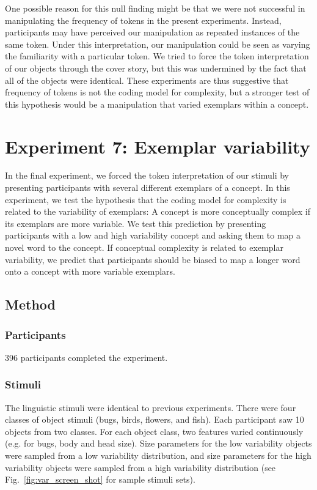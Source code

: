 One possible reason for this null finding might be that we were not successful in manipulating the frequency of tokens in the present experiments. Instead, participants may have perceived our manipulation as repeated instances of the same token. Under this interpretation, our manipulation could be seen as varying the familiarity with a particular token. We tried to force the token interpretation of our objects through the cover story, but this was undermined by the fact that all of the objects were identical. These experiments are thus  suggestive that frequency of tokens is not the coding model for complexity, but a stronger test of this hypothesis would be a manipulation that varied exemplars within a concept. 

\section{Experiment 7: Exemplar variability}
In the final experiment, we forced the token interpretation of our stimuli by presenting participants with several different exemplars of a concept. In this experiment, we test the hypothesis that the coding model for complexity is related to the variability of exemplars:  A concept is more conceptually complex if its exemplars are more variable. We test this prediction by presenting participants with a low and high variability concept and asking them to map a novel word to the concept. If conceptual complexity is related to exemplar variability, we predict that participants should be biased to map a longer word onto a concept with more variable exemplars.

\subsection{Method}
\subsubsection{Participants}
396 participants completed the experiment.
\subsubsection{Stimuli}
The linguistic stimuli were identical to previous experiments. There were four classes of object stimuli (bugs, birds, flowers, and fish). Each participant saw 10 objects from two classes. For each object class, two features varied continuously (e.g. for bugs, body and head size). Size parameters for the low variability objects were  sampled from a low variability distribution, and size parameters for the high variability objects were  sampled from a high variability distribution (see Fig.\ \ref{fig:var_screen_shot} for sample stimuli sets).

